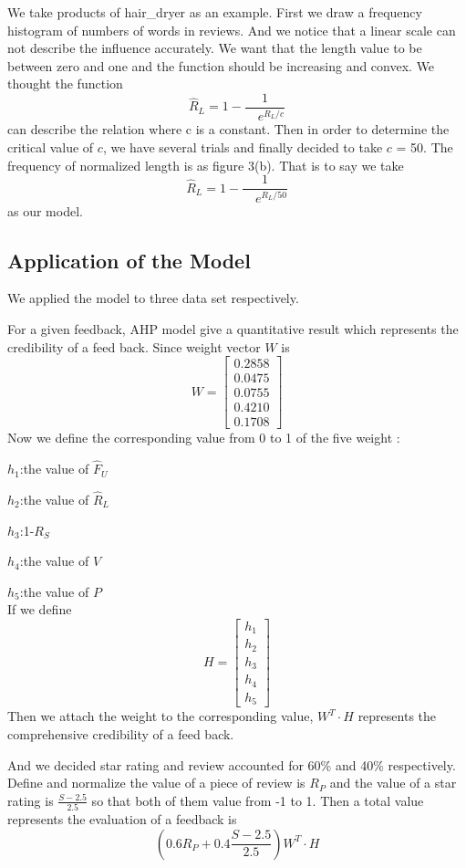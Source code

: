 \documentclass{mcmthesis}
\begin{document}
We take products of hair\_dryer as an example. First we draw a frequency histogram of numbers of words in reviews. And we notice that a linear scale can not describe the influence accurately. We want that the length value to be between zero and one and the function should be increasing and convex. We thought the function$$\widehat R_L = 1 -\frac{1}{\quad e^{R_L/c}}$$ can describe the relation where c is a constant. Then in order to determine the critical value of $c$, we have several trials and finally decided to take $c$ = 50. The frequency of normalized length is as figure 3(b). That is to say we take $$\widehat R_L = 1 -\frac{1}{\quad e^{R_L/50}}$$ as our model.




\subsection{Application of the Model}
We applied the model to three data set respectively. 

For a given feedback, AHP model give a quantitative result which represents the credibility of a feed back. Since weight vector $W$ is
$$
W = 
\begin{bmatrix}
0.2858 \\ 0.0475 \\ 0.0755 \\ 0.4210 \\ 0.1708
\end{bmatrix}
$$
Now we define the corresponding value from 0 to 1 of the five weight :

$h_1$:the value of $\widehat F_U$

$h_2$:the value of $\widehat R_L$

$h_3$:1-$R_S$

$h_4$:the value of $V$

$h_5$:the value of $P$\\
If we define$$
H = 
\begin{bmatrix}
h_1\\h_2\\h_3\\h_4\\h_5
\end{bmatrix}
$$
Then we attach the weight to the corresponding value, $W^T\cdot H$ represents the comprehensive credibility of a feed back.

And we decided star rating and review accounted for 60\% and 40\% respectively. Define and normalize the value of a piece of review is $R_P$ and the value of a star rating is $ \frac{S-2.5}{2.5}$ so that both of them value from -1 to 1. Then a total value represents the evaluation of a feedback is $$(0.6R_P+0.4\frac{S-2.5}{2.5})W^T\cdot H$$
\end{document}
